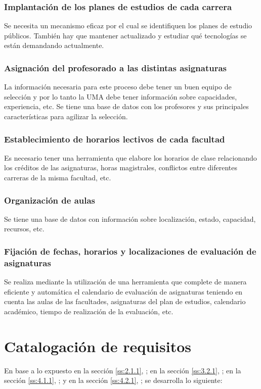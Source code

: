 \documentclass[11pt,a4paper,spanish,twoside]{book}
\begin{document}
\subsubsection{Implantación de los planes de estudios de cada carrera}
Se necesita un mecanismo eficaz por el cual se identifiquen los planes de
estudio públicos. También hay que mantener actualizado y estudiar qué
tecnologías se están demandando actualmente.  

\subsubsection{Asignación del profesorado a las distintas asignaturas}
La información necesaria para este proceso debe tener un buen equipo de
selección y por lo tanto la UMA debe tener información sobre capacidades,
experiencia, etc.
Se tiene una base de datos con los profesores y sus principales
características para agilizar la selección. 

\subsubsection{Establecimiento de horarios lectivos de cada facultad}
Es necesario tener una herramienta que elabore los horarios de clase
relacionando los créditos de las asignaturas, horas magistrales, conflictos
entre diferentes carreras de la misma facultad, etc.

\subsubsection{Organización de aulas}
Se tiene una base de datos con información sobre localización, estado,
capacidad, recursos, etc. 

\subsubsection{Fijación de  fechas, horarios y localizaciones de evaluación de
  asignaturas}
Se realiza mediante la utilización de una herramienta que complete de manera
eficiente y automática 
el calendario de evaluación de asignaturas teniendo en cuenta las aulas de
las facultades, asignaturas del plan de estudios, calendario académico,
tiempo de realización de la evaluación, etc.

\section{Catalogación de requisitos}
En base a lo expuesto 
en la sección \vref{ss:2.1.1}, \emph{}; 
en la sección \vref{ss:3.2.1}, \emph{}; 
en la sección \vref{ss:4.1.1}, \emph{}; y
en la sección \vref{ss:4.2.1}, \emph{};
se desarrolla lo siguiente:
\end{document}
